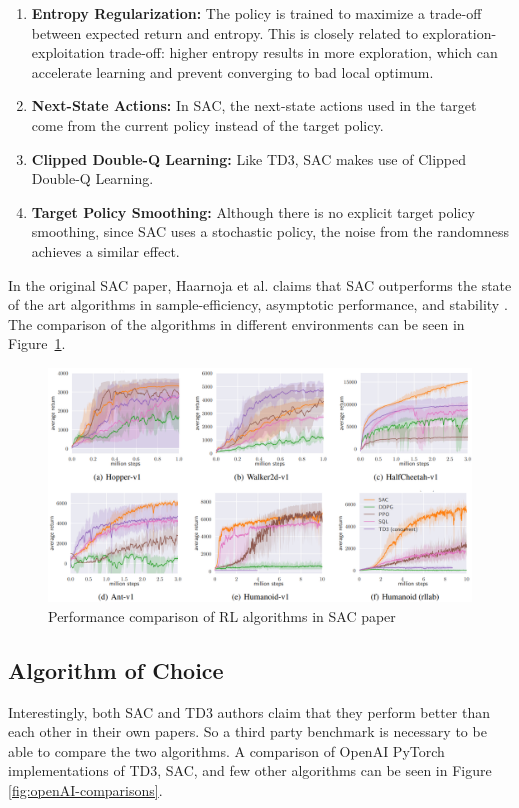 \documentclass[12pt,twoside]{report}
\begin{document}
\begin{enumerate}
  \item \textbf{Entropy Regularization:} The policy is trained to maximize a trade-off between expected return and entropy. This is closely related to exploration-exploitation trade-off: higher entropy results in more exploration, which can accelerate learning and prevent converging to bad local optimum.
  \item \textbf{Next-State Actions:} In SAC, the next-state actions used in the target come from the current policy instead of the target policy.
  \item \textbf{Clipped Double-Q Learning:} Like TD3, SAC makes use of Clipped Double-Q Learning.
  \item \textbf{Target Policy Smoothing:} Although there is no explicit target policy smoothing, since SAC uses a stochastic policy, the noise from the randomness achieves a similar effect.
\end{enumerate}

In the original SAC paper, Haarnoja et al. claims that SAC outperforms the state of the art algorithms in sample-efficiency, asymptotic performance, and stability \cite{sacOG}. The comparison of the algorithms in different environments can be seen in Figure~\ref{fig:sac-comparisons}.

\begin{figure}[h]
\centering
\includegraphics[width = \hsize]{figures/sac comparison og.png}
\caption{Performance comparison of RL algorithms in SAC paper \cite{sacOG}}
\label{fig:sac-comparisons}
\end{figure}

\subsection{Algorithm of Choice}
Interestingly, both SAC and TD3 authors claim that they perform better than each other in their own papers. So a third party benchmark is necessary to be able to compare the two algorithms. A comparison of OpenAI PyTorch implementations of TD3, SAC, and few other algorithms can be seen in Figure \ref{fig:openAI-comparisons}.
\end{document}
